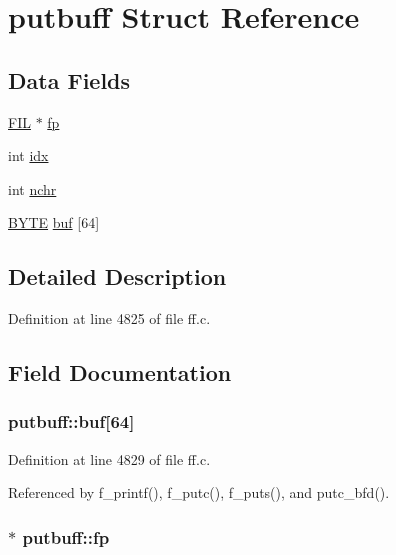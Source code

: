 \hypertarget{structputbuff}{}\section{putbuff Struct Reference}
\label{structputbuff}
\subsection*{Data Fields}
\begin{DoxyCompactItemize}
\item 
\hyperlink{structFIL}{F\+IL} $\ast$ \hyperlink{structputbuff_a5c7baa85e569be17f4888f5d92f4453c}{fp}
\item 
int \hyperlink{structputbuff_a10a3ca93af8df07e9836ebd5230c06d8}{idx}
\item 
int \hyperlink{structputbuff_a125366bfe48077e6f562f95e30b4604a}{nchr}
\item 
\hyperlink{integer_8h_a4ae1dab0fb4b072a66584546209e7d58}{B\+Y\+TE} \hyperlink{structputbuff_ae623199e5d2851f95050670170f20329}{buf} \mbox{[}64\mbox{]}
\end{DoxyCompactItemize}


\subsection{Detailed Description}


Definition at line 4825 of file ff.\+c.



\subsection{Field Documentation}
\subsubsection[{\texorpdfstring{buf}{buf}}]{ putbuff\+::buf\mbox{[}64\mbox{]}}\hypertarget{structputbuff_ae623199e5d2851f95050670170f20329}{}\label{structputbuff_ae623199e5d2851f95050670170f20329}


Definition at line 4829 of file ff.\+c.



Referenced by f\+\_\+printf(), f\+\_\+putc(), f\+\_\+puts(), and putc\+\_\+bfd().

\subsubsection[{\texorpdfstring{fp}{fp}}]{$\ast$ putbuff\+::fp}\hypertarget{structputbuff_a5c7baa85e569be17f4888f5d92f4453c}{}\label{structputbuff_a5c7baa85e569be17f4888f5d92f4453c}


